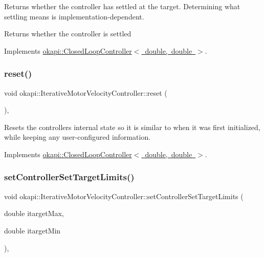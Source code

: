 Returns whether the controller has settled at the target. Determining what settling means is implementation-\/dependent.

\begin{DoxyReturn}{Returns}
whether the controller is settled 
\end{DoxyReturn}


Implements \mbox{\hyperlink{classokapi_1_1ClosedLoopController_aed7aa0e94b6474c28314f8517d6cb4d8}{okapi\+::\+Closed\+Loop\+Controller$<$ double, double $>$}}.

\mbox{\label{classokapi_1_1IterativeMotorVelocityController_a404105de7fd0e34dd50f09d47c8b110f}} 
\subsubsection{\texorpdfstring{reset()}{reset()}}
{\footnotesize\ttfamily void okapi\+::\+Iterative\+Motor\+Velocity\+Controller\+::reset (\begin{DoxyParamCaption}{ }\end{DoxyParamCaption})\hspace{0.3cm}{\ttfamily [override]}, {\ttfamily [virtual]}}

Resets the controller\textquotesingle{}s internal state so it is similar to when it was first initialized, while keeping any user-\/configured information. 

Implements \mbox{\hyperlink{classokapi_1_1ClosedLoopController_a7dd6ce28b3e38bdf987514a1b6c83c8c}{okapi\+::\+Closed\+Loop\+Controller$<$ double, double $>$}}.

\mbox{\label{classokapi_1_1IterativeMotorVelocityController_a083db063a4f8f15787a0c97068eef755}} 
\subsubsection{\texorpdfstring{setControllerSetTargetLimits()}{setControllerSetTargetLimits()}}
{\footnotesize\ttfamily void okapi\+::\+Iterative\+Motor\+Velocity\+Controller\+::set\+Controller\+Set\+Target\+Limits (\begin{DoxyParamCaption}\item[{double}]{itarget\+Max,  }\item[{double}]{itarget\+Min }\end{DoxyParamCaption})\hspace{0.3cm}{\ttfamily [override]}, {\ttfamily [virtual]}}

